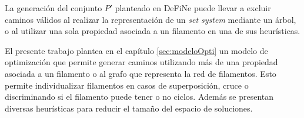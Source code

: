 

La generaci\'on del conjunto $P'$ planteado en DeFiNe puede llevar a excluir caminos v\'alidos al realizar la representaci\'on de un {\it set system} mediante un \'arbol, o al utilizar una sola propiedad asociada a un filamento en una de sus heur\'isticas. 


El presente trabajo plantea en el cap\'itulo \ref{sec:modeloOpti} un modelo de optimizaci\'on que permite generar caminos utilizando m\'as de una propiedad asociada a un filamento o al grafo que representa la red de filamentos. Esto permite individualizar filamentos en casos de superposici\'on, cruce o discriminando si el filamento puede tener o no ciclos. Adem\'as se presentan diversas heur\'isticas para reducir el tama\~no del espacio de soluciones.



